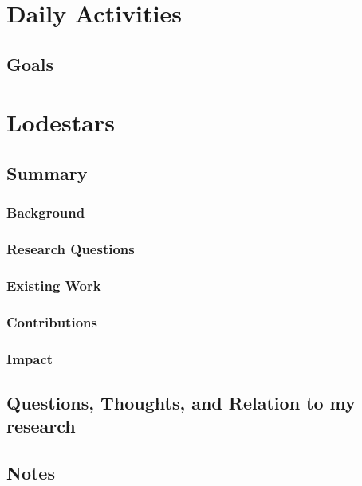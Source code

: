 \section*{Daily Activities}
\subsection*{Goals}
\begin{todolist}
    \item 
\end{todolist}

\section*{Lodestars}


\subsection{Summary}
\subsubsection{Background}
\subsubsection{Research Questions}
\subsubsection{Existing Work}
\subsubsection{Contributions}
\subsubsection{Impact}

\subsection{Questions, Thoughts, and Relation to my research}

\subsection{Notes}
